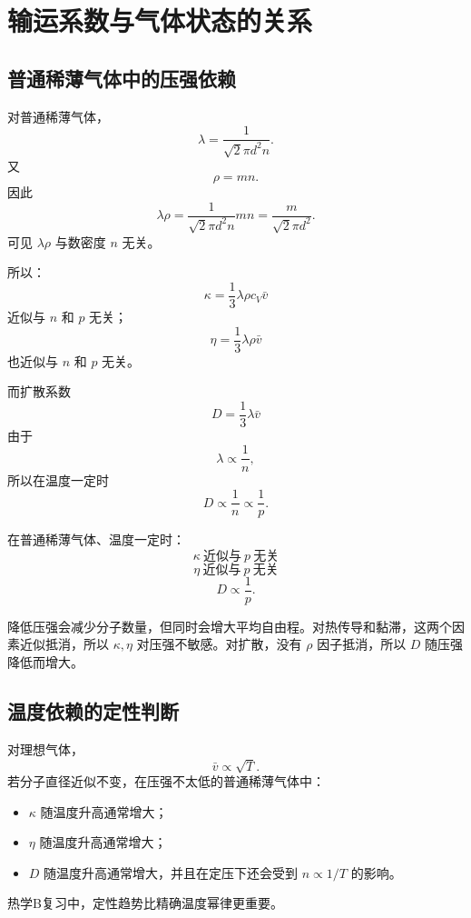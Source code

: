 \section{输运系数与气体状态的关系}

\subsection{普通稀薄气体中的压强依赖}

对普通稀薄气体，
\[
  \lambda=\frac{1}{\sqrt{2}\pi d^2n}.
\]
又
\[
  \rho=mn.
\]
因此
\[
  \lambda\rho
  =
  \frac{1}{\sqrt{2}\pi d^2n}mn
  =
  \frac{m}{\sqrt{2}\pi d^2}.
\]
可见 \(\lambda\rho\) 与数密度 \(n\) 无关。

所以：
\[
  \kappa=\frac13\lambda\rho c_V\bar v
\]
近似与 \(n\) 和 \(p\) 无关；
\[
  \eta=\frac13\lambda\rho\bar v
\]
也近似与 \(n\) 和 \(p\) 无关。

而扩散系数
\[
  D=\frac13\lambda\bar v
\]
由于
\[
  \lambda\propto\frac1n,
\]
所以在温度一定时
\[
  \boxed{
  D\propto\frac1n\propto\frac1p
  }.
\]

\begin{FormulaBox}[压强依赖总结]
在普通稀薄气体、温度一定时：
\[
  \boxed{
  \kappa \ \text{近似与}\ p\ \text{无关}
  }
\]
\[
  \boxed{
  \eta \ \text{近似与}\ p\ \text{无关}
  }
\]
\[
  \boxed{
  D\propto \frac1p
  }.
\]
\end{FormulaBox}

\begin{WarnBox}[看起来反直觉但很重要]
降低压强会减少分子数量，但同时会增大平均自由程。对热传导和黏滞，这两个因素近似抵消，所以 \(\kappa,\eta\) 对压强不敏感。对扩散，没有 \(\rho\) 因子抵消，所以 \(D\) 随压强降低而增大。
\end{WarnBox}

\subsection{温度依赖的定性判断}

对理想气体，
\[
  \bar v\propto \sqrt{T}.
\]
若分子直径近似不变，在压强不太低的普通稀薄气体中：
\begin{itemize}
  \item \(\kappa\) 随温度升高通常增大；
  \item \(\eta\) 随温度升高通常增大；
  \item \(D\) 随温度升高通常增大，并且在定压下还会受到 \(n\propto 1/T\) 的影响。
\end{itemize}

热学B复习中，定性趋势比精确温度幂律更重要。

